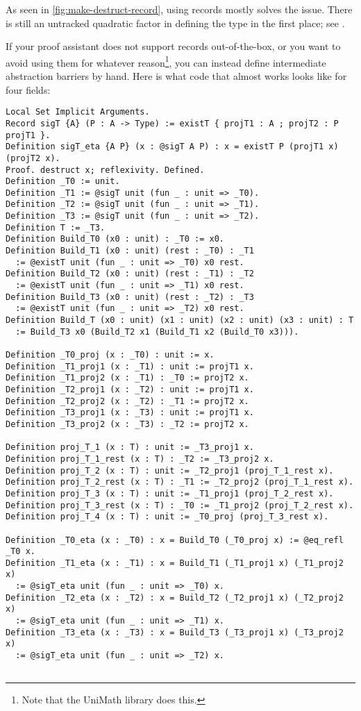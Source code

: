   As seen in \autoref{fig:make-destruct-record}, using records mostly solves the issue.
  There is still an untracked quadratic factor in defining the type in the first place; see .

  If your proof assistant does not support records out-of-the-box, or you want to avoid using them for whatever reason\footnote{Note that the UniMath library  does this. }, you can instead define intermediate abstraction barriers by hand.
  Here is what code that almost works looks like for four fields:
\begin{verbatim}
Local Set Implicit Arguments.
Record sigT {A} (P : A -> Type) := existT { projT1 : A ; projT2 : P projT1 }.
Definition sigT_eta {A P} (x : @sigT A P) : x = existT P (projT1 x) (projT2 x).
Proof. destruct x; reflexivity. Defined.
Definition _T0 := unit.
Definition _T1 := @sigT unit (fun _ : unit => _T0).
Definition _T2 := @sigT unit (fun _ : unit => _T1).
Definition _T3 := @sigT unit (fun _ : unit => _T2).
Definition T := _T3.
Definition Build_T0 (x0 : unit) : _T0 := x0.
Definition Build_T1 (x0 : unit) (rest : _T0) : _T1
  := @existT unit (fun _ : unit => _T0) x0 rest.
Definition Build_T2 (x0 : unit) (rest : _T1) : _T2
  := @existT unit (fun _ : unit => _T1) x0 rest.
Definition Build_T3 (x0 : unit) (rest : _T2) : _T3
  := @existT unit (fun _ : unit => _T2) x0 rest.
Definition Build_T (x0 : unit) (x1 : unit) (x2 : unit) (x3 : unit) : T
  := Build_T3 x0 (Build_T2 x1 (Build_T1 x2 (Build_T0 x3))).

Definition _T0_proj (x : _T0) : unit := x.
Definition _T1_proj1 (x : _T1) : unit := projT1 x.
Definition _T1_proj2 (x : _T1) : _T0 := projT2 x.
Definition _T2_proj1 (x : _T2) : unit := projT1 x.
Definition _T2_proj2 (x : _T2) : _T1 := projT2 x.
Definition _T3_proj1 (x : _T3) : unit := projT1 x.
Definition _T3_proj2 (x : _T3) : _T2 := projT2 x.

Definition proj_T_1 (x : T) : unit := _T3_proj1 x.
Definition proj_T_1_rest (x : T) : _T2 := _T3_proj2 x.
Definition proj_T_2 (x : T) : unit := _T2_proj1 (proj_T_1_rest x).
Definition proj_T_2_rest (x : T) : _T1 := _T2_proj2 (proj_T_1_rest x).
Definition proj_T_3 (x : T) : unit := _T1_proj1 (proj_T_2_rest x).
Definition proj_T_3_rest (x : T) : _T0 := _T1_proj2 (proj_T_2_rest x).
Definition proj_T_4 (x : T) : unit := _T0_proj (proj_T_3_rest x).

Definition _T0_eta (x : _T0) : x = Build_T0 (_T0_proj x) := @eq_refl _T0 x.
Definition _T1_eta (x : _T1) : x = Build_T1 (_T1_proj1 x) (_T1_proj2 x)
  := @sigT_eta unit (fun _ : unit => _T0) x.
Definition _T2_eta (x : _T2) : x = Build_T2 (_T2_proj1 x) (_T2_proj2 x)
  := @sigT_eta unit (fun _ : unit => _T1) x.
Definition _T3_eta (x : _T3) : x = Build_T3 (_T3_proj1 x) (_T3_proj2 x)
  := @sigT_eta unit (fun _ : unit => _T2) x.


\end{verbatim}
